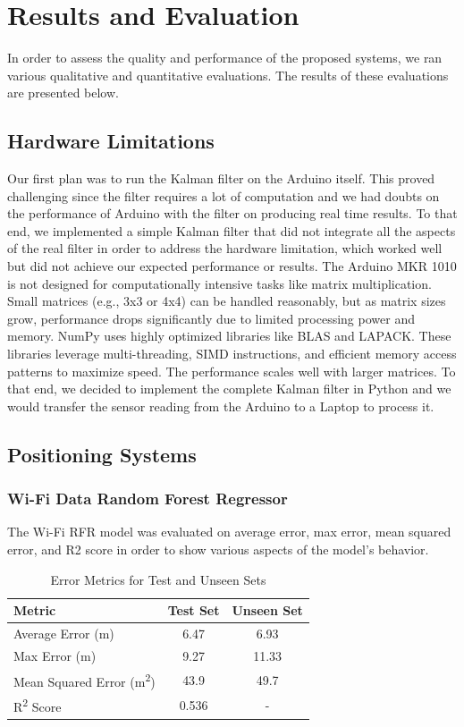\chapter{Results and Evaluation}
In order to assess the quality and performance of the proposed systems, we ran various qualitative and quantitative evaluations. The results of these evaluations are presented below.

\section{Hardware Limitations}
Our first plan was to run the Kalman filter on the Arduino itself. This proved challenging since the filter requires a lot of computation and we had doubts on the performance of Arduino with the filter on producing real time results. To that end, we implemented a simple Kalman filter that did not integrate all the aspects of the real filter in order to address the hardware limitation, which worked well but did not achieve our expected performance or results. The Arduino MKR 1010 is not designed for computationally intensive tasks like matrix multiplication. Small matrices (e.g., 3x3 or 4x4) can be handled reasonably, but as matrix sizes grow, performance drops significantly due to limited processing power and memory. NumPy uses highly optimized libraries like BLAS and LAPACK. These libraries leverage multi-threading, SIMD instructions, and efficient memory access patterns to maximize speed. The performance scales well with larger matrices.\cite{hellmers_2013_an} To that end, we decided to implement the complete Kalman filter in Python and we would transfer the sensor reading from the Arduino to a Laptop to process it.

\section{Positioning Systems}
\subsection{Wi-Fi Data Random Forest Regressor}
The Wi-Fi RFR model was evaluated on average error, max error, mean squared error, and R2 score in order to show various aspects of the model's behavior.
\begin{table}[h!]
\centering
\caption{Error Metrics for Test and Unseen Sets}
\label{tab:error_metrics}
\begin{tabular}{l c c} %
\toprule
\textbf{Metric}                  & \textbf{Test Set} & \textbf{Unseen Set} \\ 
\midrule
Average Error (m)                & 6.47              & 6.93                \\
Max Error (m)                    & 9.27              & 11.33               \\
Mean Squared Error (m\textsuperscript{2}) & 43.9              & 49.7                \\
R\textsuperscript{2} Score       & 0.536             & -                   \\ 
\bottomrule
\end{tabular}
\end{table}

